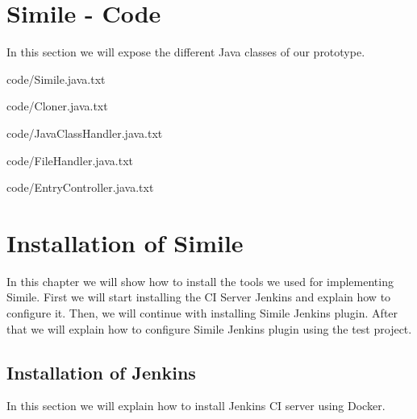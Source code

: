 \chapter{Simile - Code}
\label{append:simile-code}
In this section we will expose the different Java classes of our prototype.


{code/Simile.java.txt}


{code/Cloner.java.txt}


{code/JavaClassHandler.java.txt}


{code/FileHandler.java.txt}


{code/EntryController.java.txt}

\chapter{Installation of Simile}
In this chapter we will show how to install the tools we used for implementing Simile. First we will start installing the CI Server Jenkins and explain how to configure it. Then, we will continue with installing Simile Jenkins plugin. After that we will explain how to configure Simile Jenkins plugin using the test project.

\section{Installation of Jenkins}
In this section we will explain how to install Jenkins CI server using Docker.

